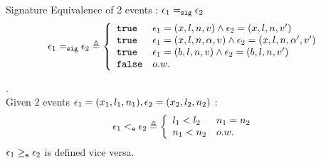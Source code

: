 %
Signature Equivalence of 2 events : $\mathtt{\epsilon}_1 =_{\mathtt{sig}} \mathtt{\epsilon}_2$
\[
\event_1 \sigeq \event_2 \triangleq
\left\{
\begin{array}{ll}
\etrue & \event_1 = (x, l, n, v) \land \event_2 = (x, l, n, v') \\
\etrue & \event_1 = (x, l, n, \qval, v) \land \event_2 = (x, l, n, \qval', v') \\
\etrue & \event_1 = (b, l, n, v) \land \event_2 = (b, l, n, v') \\
\efalse & o.w.
\end{array}
\right.
\]
%
\begin{defn}.
\label{def:query_dir}
\\
Given 2 events 
$\mathtt{\epsilon}_1 = (x_1, l_1, n_1), 
\mathtt{\epsilon}_2 = (x_2, l_2, n_2)$
:
%
\[
\event_1 \eventlt \event_2
 \triangleq 
 \left\{
 \begin{array}{ll}
    l_1 < l_2 & n_1 = n_2
    \\
    n_1 < n_2  & o.w.
\end{array}  
\right.
\]
%
$\mathtt{\epsilon}_1 \geq_{\mathtt{e}} \mathtt{\epsilon}_2$  is defined vice versa.
\end{defn}
%
%